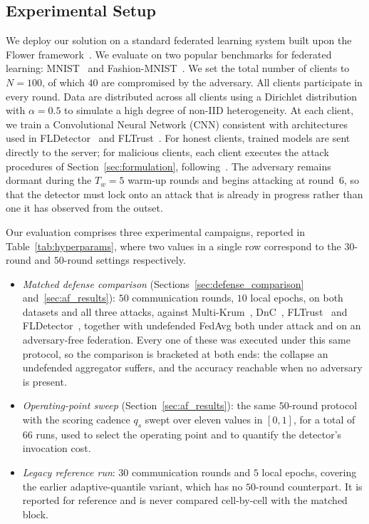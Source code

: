 \documentclass[journal]{IEEEtran}
\begin{document}
\subsection{Experimental Setup}
\label{sec:experimental_setup}

We deploy our solution on a standard federated learning system built upon the Flower framework~\cite{beutel2020flower}. We evaluate on two popular benchmarks for federated learning: MNIST~\cite{lecun1998mnist} and Fashion-MNIST~\cite{xiao2017fashion}. We set the total number of clients to $N = 100$, of which $40$ are compromised by the adversary. All clients participate in every round. Data are distributed across all clients using a Dirichlet distribution with $\alpha = 0.5$ to simulate a high degree of non-IID heterogeneity. At each client, we train a Convolutional Neural Network (CNN) consistent with architectures used in FLDetector~\cite{zhang2022fldetector} and FLTrust~\cite{cao2020fltrust}. For honest clients, trained models are sent directly to the server; for malicious clients, each client executes the attack procedures of Section~\ref{sec:formulation}, following~\cite{baruch2019little, shejwalkar2021manipulating}. The adversary remains dormant during the $T_w = 5$ warm-up rounds and begins attacking at round~$6$, so that the detector must lock onto an attack that is already in progress rather than one it has observed from the outset.

Our evaluation comprises three experimental campaigns, reported in Table~\ref{tab:hyperparams}, where two values in a single row correspond to the $30$-round and $50$-round settings respectively.
\begin{itemize}
    \item \emph{Matched defense comparison} (Sections~\ref{sec:defense_comparison} and~\ref{sec:af_results}): $50$ communication rounds, $10$ local epochs, on both datasets and all three attacks, against Multi-Krum~\cite{blanchard2017machine}, DnC~\cite{shejwalkar2021manipulating}, FLTrust~\cite{cao2020fltrust} and FLDetector~\cite{zhang2022fldetector}, together with undefended FedAvg both under attack and on an adversary-free federation. Every one of these was executed under this same protocol, so the comparison is bracketed at both ends: the collapse an undefended aggregator suffers, and the accuracy reachable when no adversary is present.
    \item \emph{Operating-point sweep} (Section~\ref{sec:af_results}): the same $50$-round protocol with the scoring cadence $q_s$ swept over eleven values in $[0,1]$, for a total of $66$ runs, used to select the operating point and to quantify the detector's invocation cost.
    \item \emph{Legacy reference run}: $30$ communication rounds and $5$ local epochs, covering the earlier adaptive-quantile variant, which has no $50$-round counterpart. It is reported for reference and is never compared cell-by-cell with the matched block.
\end{itemize}
\end{document}
